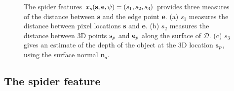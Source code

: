 \documentclass[10pt,twocolumn,letterpaper]{article}
\newcommand{\rgbdimage}{\mathcal{D}}
\newcommand{\pixelidx}{\mathbf{s}}
\newcommand{\edgeimidx}{\mathbf{e}}
\newcommand{\todo}[1]{\textcolor{red}{TODO: #1}}
\newcommand{\note}[1]{\textcolor{blue}{NOTE: #1}}
\begin{document}
\begin{figure}
        \hfill
        \hfill
    \caption{
    The spider features $\scalfeat_s(\pixelidx, \edgeimidx, \psi) = (s_1, s_2, s_3)$ provides three measures of the distance between $\pixelidx$ and the edge point $\edgeimidx$.
    (a) $s_1$ measures the distance between pixel locations $\pixelidx$ and $\edgeimidx$.
    (b) $s_2$ measures the distance between 3D points $\pointthreed$ and $\edgethreed$ along the surface of $\rgbdimage$.
    (c) $s_3$ gives an estimate of the depth of the object at the 3D location $\pointthreed$, using the surface normal $\mathbf{n}_\mathbf{s}$.
    }%
    \label{fig:features}
\end{figure}


\subsection{The spider feature}
\end{document}
